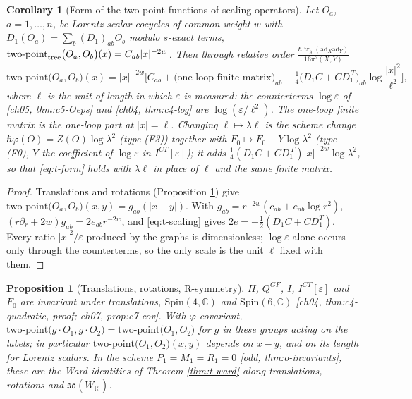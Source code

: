 \documentclass[11pt]{report}
\theoremstyle{plain}
\newtheorem{proposition}[theorem]{Proposition}
\newtheorem{corollary}[theorem]{Corollary}
\theoremstyle{definition}
\numberwithin{equation}{chapter}
\newcommand{\unit}{\tfrac{\hbar\operatorname{tr}_{\mathfrak g}(\mathrm{ad}_X\mathrm{ad}_Y)}{16\pi^2(X,Y)}}
\newcommand{\Wp}{W_{\mathbb R}^\perp}
\newcommand{\TP}[2]{\mathrm{two\mbox{-}point}\big(#1,#2\big)}
\newcommand{\TPz}[2]{\mathrm{two\mbox{-}point}_{\rm tree}\big(#1,#2\big)}
\begin{document}
\begin{corollary}[Form of the two-point functions of scaling operators]
\label{cor:t-form}
Let $O_a$, $a=1,\dots,n$, be Lorentz-scalar cocycles of common weight $w$ with $D_1(O_a)=\sum_b(D_1)_{ab}O_b$ modulo $s$-exact terms, $\TPz{O_a}{O_b}(x)=C_{ab}|x|^{-2w}$. Then through relative order $\unit$
\begin{equation}
\TP{O_a}{O_b}(x)=|x|^{-2w}\Big[C_{ab}+\big(\text{one-loop finite matrix}\big)_{ab}-\tfrac14\big(D_1C+C D_1^{\,T}\big)_{ab}\log\frac{|x|^2}{\ell^2}\Big],
\label{eq:t-form}
\end{equation}
where $\ell$ is the unit of length in which $\varepsilon$ is measured: the counterterms $\log\varepsilon$ of [ch05, thm:c5-Oeps] and [ch04, thm:c4-log] are $\log(\varepsilon/\ell^2)$. The one-loop finite matrix is the one-loop part at $|x|=\ell$. Changing $\ell\mapsto\lambda\ell$ is the scheme change $\hbar\varphi(O)=Z(O)\log\lambda^2$ (type (F3)) together with $F_0\mapsto F_0-Y\log\lambda^2$ (type (F0), $Y$ the coefficient of $\log\varepsilon$ in $I^{CT}[\varepsilon]$); it adds $\tfrac14(D_1C+CD_1^{\,T})|x|^{-2w}\log\lambda^2$, so that \eqref{eq:t-form} holds with $\lambda\ell$ in place of $\ell$ and the same finite matrix.
\end{corollary}

\begin{proof}
Translations and rotations (Proposition \ref{prop:t-cov}) give $\TP{O_a}{O_b}(x,y)=g_{ab}(|x-y|)$. With $g_{ab}=r^{-2w}(c_{ab}+e_{ab}\log r^2)$, $(r\partial_r+2w)g_{ab}=2e_{ab}r^{-2w}$, and \eqref{eq:t-scaling} gives $2e=-\tfrac12(D_1C+CD_1^T)$. Every ratio $|x|^2/\varepsilon$ produced by the graphs is dimensionless; $\log\varepsilon$ alone occurs only through the counterterms, so the only scale is the unit $\ell$ fixed with them.
\end{proof}

\begin{proposition}[Translations, rotations, R-symmetry]
\label{prop:t-cov}
$H$, $Q^{GF}$, $I$, $I^{CT}[\varepsilon]$ and $F_0$ are invariant under translations, $\mathrm{Spin}(4,\mathbb C)$ and $\mathrm{Spin}(6,\mathbb C)$ [ch04, thm:c4-quadratic, proof; ch07, prop:c7-cov]. With $\varphi$ covariant, $\TP{g\cdot O_1}{g\cdot O_2}=\TP{O_1}{O_2}$ for $g$ in these groups acting on the labels; in particular $\TP{O_1}{O_2}(x,y)$ depends on $x-y$, and on its length for Lorentz scalars. In the scheme $P_1=M_1=R_1=0$ [odd, thm:o-invariants], these are the Ward identities of Theorem \ref{thm:t-ward} along translations, rotations and $\mathfrak{so}(\Wp)$.
\end{proposition}
\end{document}
